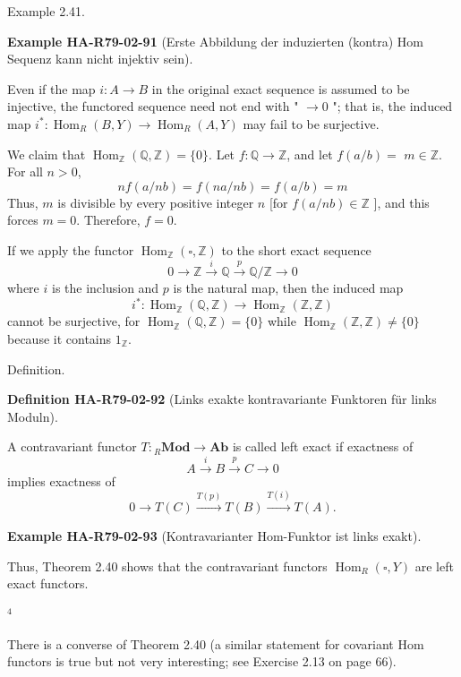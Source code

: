 \documentclass[10pt, letterpaper]{article}
\newcommand{\CustomHeading}[3]{%
  \par\medskip\noindent%
  \textbf{#1 #2} \textnormal{(#3)}.\enskip%
}
\newenvironment{DEF}[2]{\begin{unitbox}\CustomHeading{Definition}{#1}{#2}}{\end{unitbox}}
\newenvironment{EXA}[2]{\begin{unitbox}\CustomHeading{Example}{#1}{#2}}{\end{unitbox}}
\begin{document}
Example 2.41. 

\begin{EXA}{HA-R79-02-91}{Erste Abbildung der induzierten (kontra) Hom Sequenz kann nicht injektiv sein}
Even if the map $i: A \rightarrow B$ in the original exact sequence is assumed to be injective, the functored sequence need not end with " $\rightarrow 0$ "; that is, the induced map $i^{*}: \operatorname{Hom}_{R}(B, Y) \rightarrow \operatorname{Hom}_{R}(A, Y)$ may fail to be surjective.

We claim that $\operatorname{Hom}_{\mathbb{Z}}(\mathbb{Q}, \mathbb{Z})=\{0\}$. Let $f: \mathbb{Q} \rightarrow \mathbb{Z}$, and let $f(a / b)=$ $m \in \mathbb{Z}$. For all $n>0$,
$$
n f(a / n b)=f(n a / n b)=f(a / b)=m
$$
Thus, $m$ is divisible by every positive integer $n$ [for $f(a / n b) \in \mathbb{Z}$ ], and this forces $m=0$. Therefore, $f=0$.

If we apply the functor $\operatorname{Hom}_{\mathbb{Z}}(\square, \mathbb{Z})$ to the short exact sequence
$$
0 \rightarrow \mathbb{Z} \xrightarrow{i} \mathbb{Q} \xrightarrow{p} \mathbb{Q} / \mathbb{Z} \rightarrow 0
$$
where $i$ is the inclusion and $p$ is the natural map, then the induced map
$$
i^{*}: \operatorname{Hom}_{\mathbb{Z}}(\mathbb{Q}, \mathbb{Z}) \rightarrow \operatorname{Hom}_{\mathbb{Z}}(\mathbb{Z}, \mathbb{Z})
$$
cannot be surjective, for $\operatorname{Hom}_{\mathbb{Z}}(\mathbb{Q}, \mathbb{Z})=\{0\}$ while $\operatorname{Hom}_{\mathbb{Z}}(\mathbb{Z}, \mathbb{Z}) \neq\{0\}$ because it contains $1_{\mathbb{Z}}$.
\end{EXA}



Definition. 

\begin{DEF}{HA-R79-02-92}{Links exakte kontravariante Funktoren für links Moduln}
A contravariant functor $T:{ }_{R} \mathbf{M o d} \rightarrow \mathbf{A b}$ is called left exact if exactness of
$$
A \xrightarrow{i} B \xrightarrow{p} C \rightarrow 0
$$
implies exactness of
$$
0 \rightarrow T(C) \xrightarrow{T(p)} T(B) \xrightarrow{T(i)} T(A) .
$$
\end{DEF}


\begin{EXA}{HA-R79-02-93}{Kontravarianter Hom-Funktor ist links exakt}
Thus, Theorem 2.40 shows that the contravariant functors $\operatorname{Hom}_{R}(\square, Y)$ are left exact functors.
\end{EXA}

${ }^{4}$


There is a converse of Theorem 2.40 (a similar statement for covariant Hom functors is true but not very interesting; see Exercise 2.13 on page 66).
\end{document}
